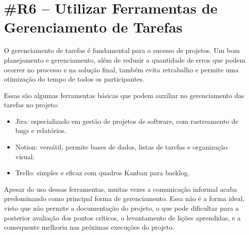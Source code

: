 \section*{\#R6 – Utilizar Ferramentas de Gerenciamento de Tarefas}

O gerenciamento de tarefas é fundamental para o sucesso de projetos. Um bom planejamento e gerenciamento, além de reduzir a quantidade de erros que podem ocorrer no processo e na solução final, também evita retrabalho e permite uma otimização do tempo de todos os participantes.

Essas são algumas ferramentas básicas que podem auxiliar no gerenciamento das tarefas no projeto:

\begin{itemize}
    \item Jira: especializado em gestão de projetos de software, com rastreamento de bugs e relatórios.
    \item Notion: versátil, permite bases de dados, listas de tarefas e organização visual.
    \item Trello: simples e eficaz com quadros Kanban para backlog.
\end{itemize}

Apesar do uso dessas ferramentas, muitas vezes a comunicação informal acaba predominando como principal forma de gerenciamento. Essa não é a forma ideal, visto que não permite a documentação do projeto, o que pode dificultar para a posterior avaliação dos pontos críticos, o levantamento de lições aprendidas, e a consequente melhoria nas próximas execuções do projeto.